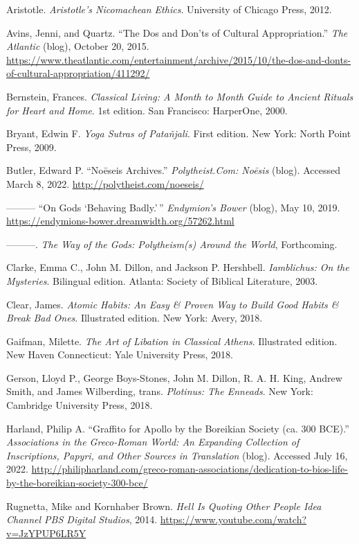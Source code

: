 \documentclass[
]{book}
\begin{document}
Aristotle. \emph{Aristotle's Nicomachean Ethics}. University of Chicago Press, 2012.

Avins, Jenni, and Quartz. ``The Dos and Don'ts of Cultural Appropriation.'' \emph{The Atlantic} (blog), October 20, 2015. \url{https://www.theatlantic.com/entertainment/archive/2015/10/the-dos-and-donts-of-cultural-appropriation/411292/}

Bernstein, Frances. \emph{Classical Living: A Month to Month Guide to Ancient Rituals for Heart and Home}. 1st edition. San Francisco: HarperOne, 2000.

Bryant, Edwin F. \emph{Yoga Sutras of Patañjali}. First edition. New York: North Point Press, 2009.

Butler, Edward P. ``Noēseis Archives.'' \emph{Polytheist.Com: Noēsis} (blog). Accessed March 8, 2022. \url{http://polytheist.com/noeseis/}

--------- ``On Gods `Behaving Badly.'\,'' \emph{Endymion's Bower} (blog), May 10, 2019. \url{https://endymions-bower.dreamwidth.org/57262.html}

---------. \emph{The Way of the Gods: Polytheism(s) Around the World}, Forthcoming.

Clarke, Emma C., John M. Dillon, and Jackson P. Hershbell. \emph{Iamblichus: On the Mysteries}. Bilingual edition. Atlanta: Society of Biblical Literature, 2003.

Clear, James. \emph{Atomic Habits: An Easy \& Proven Way to Build Good Habits \& Break Bad Ones}. Illustrated edition. New York: Avery, 2018.

Gaifman, Milette. \emph{The Art of Libation in Classical Athens}. Illustrated edition. New Haven Connecticut: Yale University Press, 2018.

Gerson, Lloyd P., George Boys-Stones, John M. Dillon, R. A. H. King, Andrew Smith, and James Wilberding, trans. \emph{Plotinus: The Enneads}. New York: Cambridge University Press, 2018.

Harland, Philip A. ``Graffito for Apollo by the Boreikian Society (ca. 300 BCE).'' \emph{Associations in the Greco-Roman World: An Expanding Collection of Inscriptions, Papyri, and Other Sources in Translation} (blog). Accessed July 16, 2022. \url{http://philipharland.com/greco-roman-associations/dedication-to-bios-life-by-the-boreikian-society-300-bce/}

Rugnetta, Mike and Kornhaber Brown. \emph{Hell Is Quoting Other People \textbar{} Idea Channel \textbar{} PBS Digital Studios}, 2014. \url{https://www.youtube.com/watch?v=JzYPUP6LR5Y}
\end{document}
